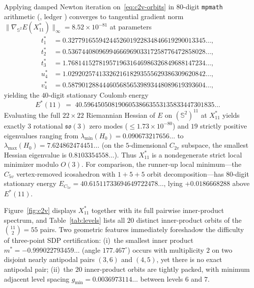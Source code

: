 \documentclass[11pt,reqno]{amsart}
\renewcommand{\_}{\origunderscore\allowbreak}
\theoremstyle{definition}
\newcommand{\Sph}{\mathbb{S}^2}
\newcommand{\norm}[1]{\lVert #1 \rVert}
\newcommand{\Xstar}{X^*_{11}}
\begin{document}
Applying damped Newton iteration on~\eqref{eq:c2v-orbits} in $80$-digit \texttt{mpmath} arithmetic (, ledger ) converges to tangential gradient norm $\norm{\nabla_{\Sph} E(\Xstar)}_\infty = 8.52 \times 10^{-81}$ at parameters
\begin{align*}
  t_1^* &= 0.3277916559424452601922834846619290013345\ldots, \\
  t_2^* &= 0.5367440809699466696903317258776472858028\ldots, \\
  t_3^* &= 1.7681415278195719631646986326849688147234\ldots, \\
  u_4^* &= 1.0292025741332621618293555629386309620842\ldots, \\
  v_4^* &= 0.5879012884446056856539893448089619393604\ldots,
\end{align*}
yielding the $40$-digit stationary Coulomb energy
\begin{equation}\label{eq:Estar}
  E^*(11) \;=\; 40.59645050819060538663553135833447301835\ldots
\end{equation}
Evaluating the full $22 \times 22$ Riemannian Hessian of $E$ on $(\Sph)^{11}$ at $\Xstar$ yields exactly $3$ rotational $\mathfrak{so}(3)$ zero modes ($\le 1.73 \times 10^{-80}$) and $19$ strictly positive eigenvalues ranging from $\lambda_{\min}(H_0) = 0.090673217656\ldots$ to $\lambda_{\max}(H_0) = 7.624862474451\ldots$ (on the $5$-dimensional $C_{2v}$ subspace, the smallest Hessian eigenvalue is $0.8103354558\ldots$). Thus $\Xstar$ is a nondegenerate strict local minimizer modulo $O(3)$.
For comparison, the runner-up local minimum---the $C_{5v}$ vertex-removed icosahedron with $1 + 5 + 5$ orbit decomposition---has $80$-digit stationary energy $E_{C_{5v}} = 40.61511733694649722478\ldots$, lying $+0.0186668288$ above $E^*(11)$.

Figure~\ref{fig:c2v} displays $\Xstar$ together with its full pairwise inner-product spectrum, and Table~\ref{tab:levels} lists all $20$ distinct inner-product orbits of the $\binom{11}{2} = 55$ pairs.
Two geometric features immediately foreshadow the difficulty of three-point SDP certification:
(i)~the smallest inner product $m^* = -0.999022793459\ldots$ (angle $177.467^\circ$) occurs with multiplicity $2$ on two disjoint nearly antipodal pairs $(3,6)$ and $(4,5)$, yet there is no exact antipodal pair;
(ii)~the $20$ inner-product orbits are tightly packed, with minimum adjacent level spacing $g_{\min} = 0.0036973114\ldots$ between levels $6$ and $7$.
\end{document}
